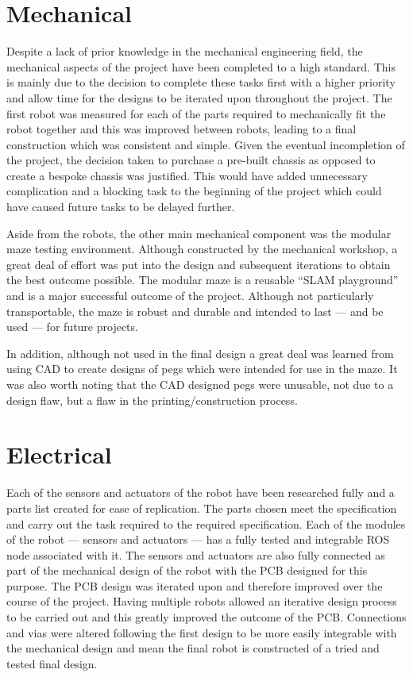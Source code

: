 \section{Mechanical}\label{eval/mech}
Despite a lack of prior knowledge in the mechanical engineering field, the 
mechanical aspects of the project have been completed to a 
high standard. This is mainly due to the decision to complete these tasks first 
with a higher priority and allow time for the designs to 
be iterated upon throughout the project. The first robot was measured for each 
of the parts required to mechanically fit the robot 
together and this was improved between robots, leading to a final construction 
which was consistent and simple. Given the eventual 
incompletion of the project, the decision taken to purchase a pre-built chassis 
as opposed to create a bespoke chassis was justified. 
This would have added unnecessary complication and a blocking task to the 
beginning of the project which could have caused future tasks 
to be delayed further. 

Aside from the robots, the other main mechanical component was the modular maze testing environment. Although constructed by the mechanical workshop, a great deal of effort was put into the design and subsequent iterations to obtain the best outcome possible. The modular maze is a reusable ``SLAM playground'' and is a major successful outcome of the project. Although not particularly transportable, the maze is robust and durable and intended to last --- and be used --- for future projects.

In addition, although not used in the final design a great deal was learned from using CAD to create designs of pegs which were intended for use in the maze. It was also worth noting that the CAD designed pegs were unusable, not due to a design flaw, but a flaw in the printing/construction process.  



\section{Electrical}\label{eval/elec}
Each of the sensors and actuators of the robot have been researched fully and a 
parts list created for ease of replication. The parts chosen meet the 
specification and carry out the task required to the required specification. 
Each of the modules of the robot --- sensors and actuators --- has a fully 
tested and integrable ROS node associated with it. The sensors and actuators are 
also fully connected as part of the mechanical design of the robot with the PCB 
designed for this purpose. The PCB design was iterated upon and therefore 
improved over the course of the project. Having multiple robots allowed an 
iterative design process to be carried out and this greatly improved the outcome 
of the PCB. Connections and vias were altered following the first design to be 
more easily integrable with the mechanical design and mean the final robot is 
constructed of a tried and tested final design. 

